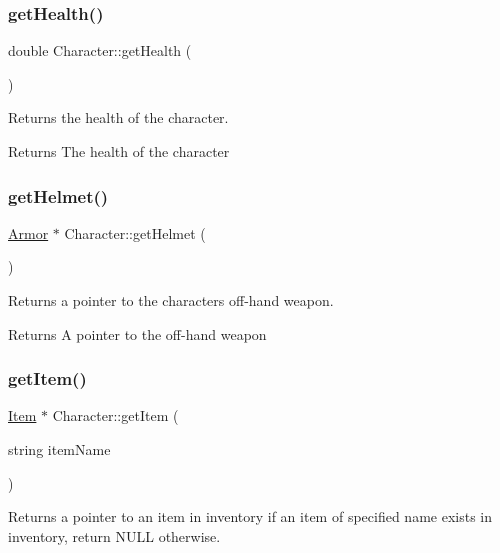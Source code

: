 \subsubsection{\texorpdfstring{getHealth()}{getHealth()}}
{\footnotesize\ttfamily double Character\+::get\+Health (\begin{DoxyParamCaption}{ }\end{DoxyParamCaption})}



Returns the health of the character. 

\begin{DoxyReturn}{Returns}
The health of the character 
\end{DoxyReturn}
\mbox{\label{class_character_a4e4cb7d3a8fb615db8f4a8c6543c447f}} 
\subsubsection{\texorpdfstring{getHelmet()}{getHelmet()}}
{\footnotesize\ttfamily \mbox{\hyperlink{class_armor}{Armor}} $\ast$ Character\+::get\+Helmet (\begin{DoxyParamCaption}{ }\end{DoxyParamCaption})}



Returns a pointer to the character\textquotesingle{}s off-\/hand weapon. 

\begin{DoxyReturn}{Returns}
A pointer to the off-\/hand weapon 
\end{DoxyReturn}
\mbox{\label{class_character_aff695a0c7cbea72f60fcaf37922bca29}} 
\subsubsection{\texorpdfstring{getItem()}{getItem()}}
{\footnotesize\ttfamily \mbox{\hyperlink{class_item}{Item}} $\ast$ Character\+::get\+Item (\begin{DoxyParamCaption}\item[{string}]{item\+Name }\end{DoxyParamCaption})}



Returns a pointer to an item in inventory if an item of specified name exists in inventory, return N\+U\+LL otherwise. 


